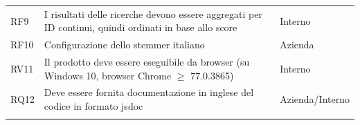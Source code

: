 \begin{longtable}{lp{}p{}}
        RF9 & I risultati delle ricerche devono essere aggregati per ID continui, quindi ordinati in base allo score & Interno \\ \addlinespace
        RF10 & Configurazione dello stemmer italiano & Azienda \\ \addlinespace
        RV11 & Il prodotto deve essere eseguibile da browser (su Windows 10, browser Chrome $\geq$ 77.0.3865) & Interno \\ \addlinespace
        RQ12 & Deve essere fornita documentazione in inglese del codice in formato \gls{jsdoc} & Azienda/Interno \\ \addlinespace
\label{tabella:requisitiIndividuati}
\end{longtable}

